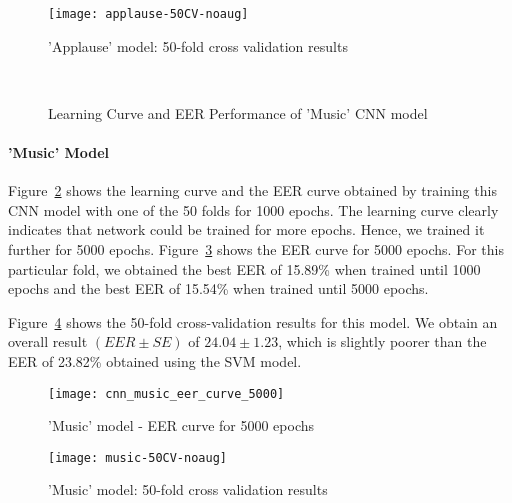 \begin{figure}[!hb] 
\centering 
\texttt{[image: applause-50CV-noaug]} 
\caption['Applause' model: 50-fold cross validation results]{'Applause' model: 50-fold cross validation results}
\label{fig:applause-50CV-noaug} 
\end{figure}

\begin{figure}[!hb]
\centering
{} \quad
{} \\
\caption[Learning Curve and EER Performance of 'Music' CNN model]{Learning Curve and EER Performance of 'Music' CNN model}
\label{fig:music_1d_cnn_results}
\end{figure}

\paragraph{'Music' Model}
Figure~\ref{fig:music_1d_cnn_results} shows the learning curve and the EER curve obtained by training this CNN model with one of the 50 folds for 1000 epochs. The learning curve clearly indicates that network could be trained for more epochs. Hence, we trained it further for 5000 epochs. Figure~\ref{fig:music_eer_5000} shows the EER curve for 5000 epochs. For this particular fold, we obtained the best EER of 15.89\% when trained until 1000 epochs and the best EER of 15.54\% when trained until 5000 epochs. 

Figure~\ref{fig:music-50CV-noaug} shows the 50-fold cross-validation results for this model. We obtain an overall result $(EER \pm SE)$ of $24.04 \pm 1.23$, which is slightly poorer than the EER of 23.82\% obtained using the SVM model.

\begin{figure}[!htb] 
\centering 
\texttt{[image: cnn\_music\_eer\_curve\_5000]} 
\caption['Music' model EER curve for 5000 epochs]{'Music' model - EER curve for 5000 epochs}
\label{fig:music_eer_5000} 
\end{figure}

\begin{figure}[!hb] 
\centering 
\texttt{[image: music-50CV-noaug]} 
\caption['Music' model: 50-fold cross validation results]{'Music' model: 50-fold cross validation results}
\label{fig:music-50CV-noaug} 
\end{figure}

